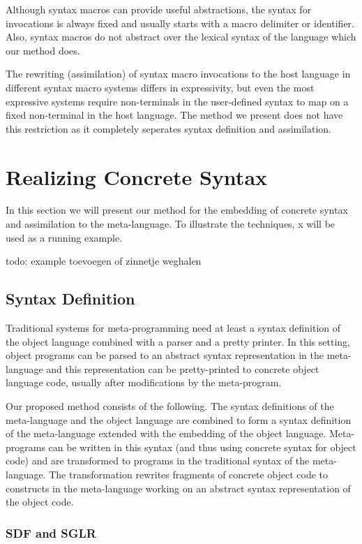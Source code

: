 \documentclass[a4paper,11pt]{article}
\begin{document}
Although syntax macros can provide useful abstractions, the syntax for
invocations is always fixed and usually starts with a macro delimiter or
identifier. Also, syntax macros do not abstract over the lexical syntax
of the language which our method does.

The rewriting (assimilation) of syntax macro invocations to the host
language in different syntax macro systems differs in expressivity, but
even the most expressive systems \cite{Weis93, Sha96} require non-terminals in the user-defined
syntax to map on a fixed non-terminal in the host language. The method
we present does not have this restriction as it completely seperates syntax
definition and assimilation.


\section{Realizing Concrete Syntax}\label{sec:realization}

In this section we will present our method for the embedding of concrete
syntax and assimilation to the meta-language. To illustrate the techniques,
x will be used as a running example.

todo: example toevoegen of zinnetje weghalen


\subsection{Syntax Definition}

Traditional systems for meta-programming need at least a syntax definition
of the object language combined with a parser and a pretty printer. In this
setting, object programs can be parsed to an abstract syntax representation
in the meta-language and this representation can be pretty-printed to
concrete object language code, usually after modifications by the meta-program.

Our proposed method consists of the following. The syntax definitions of the
meta-language and the object language are combined to form a syntax definition
of the meta-language extended with the embedding of the object language.
Meta-programs can be written in this syntax (and thus using concrete syntax
for object code) and are transformed to programs in the traditional syntax of
the meta-language. The transformation rewrites fragments of concrete object
code to constructs in the meta-language working on an abstract syntax representation
of the object code.

\subsubsection*{SDF and SGLR}
\end{document}
